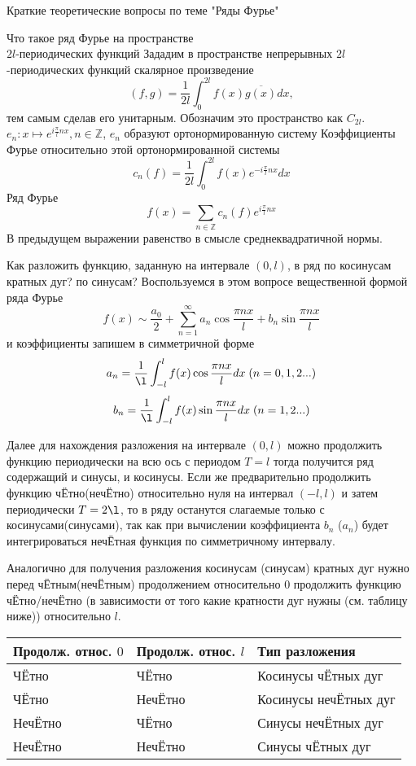 \documentclass{article}
\begin{document}
\begin{section}{Краткие теоретические вопросы по теме "Ряды Фурье"}
\begin{subsection}{Что такое ряд Фурье на пространстве\\$2l$-периодических функций}
Зададим в пространстве непрерывных $2l$-периодических функций скалярное произведение
\[(f, g) = \frac{1}{2l}\int_0^{2l}f(x)\overline{g(x)}dx,\]
тем самым сделав его унитарным. Обозначим это пространство как $C_{2l}$.\\

$e_n: x \mapsto e^{i\frac{\pi}{l}nx}, n \in \mathbb{Z}$, $e_n$ образуют ортонормированную систему
Коэффициенты Фурье относительно этой ортонормированной системы
\[c_n(f) = \frac{1}{2l} \int_0^{2l}f(x)e^{-i\frac{\pi}{l}nx}dx\]
Ряд Фурье 
\[f(x) = \sum_{n \in \mathbb{Z}} c_n(f)e^{i\frac{\pi}{l}nx}\]
В предыдущем выражении равенство в смысле среднеквадратичной нормы.
\end{subsection}


\begin{subsection}{Как разложить функцию, заданную на интервале $(0, l)$, в ряд по косинусам кратных дуг? по синусам?}
Воспользуемся в этом вопросе вещественной формой ряда Фурье
\[f(x) \sim \frac{a_0}{2}+\sum_{n=1}^{\infty}a_n \cos \frac{\pi nx}{l} +b_n \sin \frac{\pi nx}{l}\]
и коэффициенты запишем в симметричной форме
\[a_n = \frac{1}{\l}\int_{-l}^l f(x)\cos \frac{\pi nx}{l} dx\; (n = 0, 1, 2 ...)\]
\[b_n = \frac{1}{\l}\int_{-l}^l f(x)\sin \frac{\pi nx}{l} dx\; (n = 1, 2 ...)\]

Далее для нахождения разложения на интервале $(0, l)$ можно продолжить функцию периодически на всю ось с периодом $T = l$ тогда получится ряд содержащий и синусы, и косинусы. Если же предварительно продолжить функцию чЁтно(нечЁтно) относительно нуля на интервал $ (-l, l) $ и затем периодически $T = 2\l$, то в ряду останутся слагаемые только с косинусами(синусами), так как при вычислении коэффициента $ b_n $ ($a_n$) будет интегрироваться нечЁтная функция по симметричному интервалу.

Аналогично для получения разложения косинусам (синусам) кратных дуг нужно перед чЁтным(нечЁтным) продолжением относительно 0 продолжить функцию чЁтно/нечЁтно (в зависимости от того какие кратности дуг нужны (см. таблицу ниже)) относительно $l$.

\begin{table}[h]
	\begin{tabular}{|l|l|l|}
		\hline
		Продолж. относ. $0$     	 & Продолж. относ. $l$ 	& Тип разложения        \\ \hline
		ЧЁтно                        & ЧЁтно                        & Косинусы чЁтных дуг   \\ \hline
		ЧЁтно                        & НечЁтно                      & Косинусы нечЁтных дуг \\ \hline
		НечЁтно                      & ЧЁтно                        & Синусы нечЁтных дуг     \\ \hline
		НечЁтно                      & НечЁтно                      & Синусы чЁтных дуг   \\ \hline
	\end{tabular}
\end{table}


\end{subsection}
\end{section}
\end{document}
